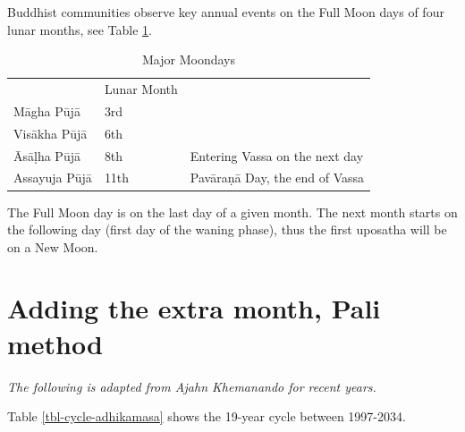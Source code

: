 \documentclass[11pt,oneside]{memoir-article}
\begin{document}
Buddhist communities observe key annual events on the Full Moon
days of four lunar months, see Table \ref{tbl-major-moons}.

\begin{table}[htb]
\caption{\label{tbl-major-moons}Major Moondays}
\centering
\begin{tabular}{lll}
 & Lunar Month & \\
Māgha Pūjā & 3rd & \\
Visākha Pūjā & 6th & \\
Āsāḷha Pūjā & 8th & Entering Vassa on the next day\\
Assayuja Pūjā & 11th & Pavāraṇā Day, the end of Vassa\\
\end{tabular}
\end{table}

The Full Moon day is on the last day of a given month. The next month
starts on the following day (first day of the waning phase), thus the
first uposatha will be on a New Moon.

\chapter{Adding the extra month, Pali method}
\label{sec-2}

\emph{The following is adapted from Ajahn Khemanando for recent
years.}\cite{khemanando-adhikamasa}

Table \ref{tbl-cycle-adhikamasa} shows the 19-year cycle between
1997-2034.
\end{document}
